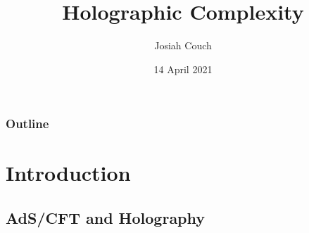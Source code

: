 \documentclass[8pt,aspectratio=169]{beamer}
\title{Holographic Complexity}
\author{Josiah Couch}
\institute{University of Texas at Austin}
\date{14 April 2021}
\begin{document}
\begin{frame}
\titlepage\end{frame}

\begin{frame}
\frametitle{Outline}
\tableofcontents[]
\end{frame}

\section{Introduction}
\begin{frame}
\sectionpage
\end{frame}

\subsection{AdS/CFT and Holography}
\end{document}
